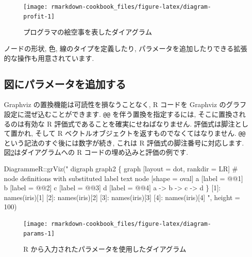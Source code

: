 \documentclass[
  11pt,
  lualatex,ja=standard,jafont=noto]{bxjsreport}
\newenvironment{Shaded}{\begin{snugshade}}{\end{snugshade}}
\newcommand{\AttributeTok}[1]{\textcolor[rgb]{0.77,0.63,0.00}{#1}}
\newcommand{\DecValTok}[1]{\textcolor[rgb]{0.00,0.00,0.81}{#1}}
\newcommand{\FunctionTok}[1]{\textcolor[rgb]{0.00,0.00,0.00}{#1}}
\newcommand{\NormalTok}[1]{#1}
\newcommand{\SpecialCharTok}[1]{\textcolor[rgb]{0.00,0.00,0.00}{#1}}
\newcommand{\StringTok}[1]{\textcolor[rgb]{0.31,0.60,0.02}{#1}}
\begin{document}
\begin{figure}

{\centering \texttt{[image: rmarkdown-cookbook\_files/figure-latex/diagram-profit-1]} 

}

\caption{プログラマの絵空事を表したダイアグラム}\label{fig:diagram-profit}
\end{figure}

ノードの形状, 色, 線のタイプを定義したり, パラメータを追加したりできる拡張的な操作も用意されています.

\hypertarget{adding-parameters-to-plots}{%
\subsection{図にパラメータを追加する}\label{adding-parameters-to-plots}}

Graphviz の置換機能は可読性を損なうことなく, R コードを Graphviz のグラフ設定に混ぜ込むことができます. \texttt{@@} を伴う置換を指定するには, そこに置換されるのは有効な R 評価式であることを確実にせねばなりません. 評価式は脚注として置かれ, そして R ベクトルオブジェクトを返すものでなくてはなりません. \texttt{@@} という記法のすぐ後には数字が続き, これは R 評価式の脚注番号に対応します. 図\ref{fig:diagram-params}はダイアグラムへの R コードの埋め込みと評価の例です.

\begin{Shaded}
\begin{Highlighting}[numbers=left,,]
\NormalTok{DiagrammeR}\SpecialCharTok{::}\FunctionTok{grViz}\NormalTok{(}\StringTok{"}
\StringTok{  digraph graph2 \{}
\StringTok{  }
\StringTok{  graph [layout = dot, rankdir = LR]}
\StringTok{  }
\StringTok{  \# node definitions with substituted label text}
\StringTok{  node [shape = oval]}
\StringTok{  a [label = \textquotesingle{}@@1\textquotesingle{}]}
\StringTok{  b [label = \textquotesingle{}@@2\textquotesingle{}]}
\StringTok{  c [label = \textquotesingle{}@@3\textquotesingle{}]}
\StringTok{  d [label = \textquotesingle{}@@4\textquotesingle{}]}
\StringTok{  }
\StringTok{  a {-}\textgreater{} b {-}\textgreater{} c {-}\textgreater{} d}
\StringTok{  \}}
\StringTok{  }
\StringTok{  [1]: names(iris)[1]}
\StringTok{  [2]: names(iris)[2]}
\StringTok{  [3]: names(iris)[3]}
\StringTok{  [4]: names(iris)[4]}
\StringTok{  "}\NormalTok{, }
  \AttributeTok{height =} \DecValTok{100}\NormalTok{)}
\end{Highlighting}
\end{Shaded}

\begin{figure}

{\centering \texttt{[image: rmarkdown-cookbook\_files/figure-latex/diagram-params-1]} 

}

\caption{R から入力されたパラメータを使用したダイアグラム}\label{fig:diagram-params}
\end{figure}
\end{document}
